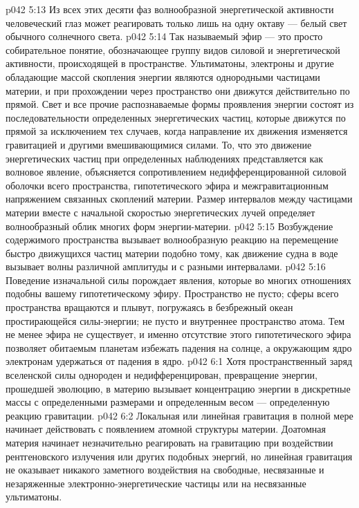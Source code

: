 \vs p042 5:13 \pc Из всех этих десяти фаз волнообразной энергетической активности человеческий глаз может реагировать только лишь на одну октаву --- белый свет обычного солнечного света.
\vs p042 5:14 \pc Так называемый эфир --- это просто собирательное понятие, обозначающее группу видов силовой и энергетической активности, происходящей в пространстве. Ультиматоны, электроны и другие обладающие массой скопления энергии являются однородными частицами материи, и при прохождении через пространство они движутся действительно по прямой. Свет и все прочие распознаваемые формы проявления энергии состоят из последовательности определенных энергетических частиц, которые движутся по прямой за исключением тех случаев, когда направление их движения изменяется гравитацией и другими вмешивающимися силами. То, что это движение энергетических частиц при определенных наблюдениях представляется как волновое явление, объясняется сопротивлением недифференцированной силовой оболочки всего пространства, гипотетического эфира и межгравитационным напряжением связанных скоплений материи. Размер интервалов между частицами материи вместе с начальной скоростью энергетических лучей определяет волнообразный облик многих форм энергии\hyp{}материи.
\vs p042 5:15 Возбуждение содержимого пространства вызывает волнообразную реакцию на перемещение быстро движущихся частиц материи подобно тому, как движение судна в воде вызывает волны различной амплитуды и с разными интервалами.
\vs p042 5:16 Поведение изначальной силы порождает явления, которые во многих отношениях подобны вашему гипотетическому эфиру. Пространство не пусто; сферы всего пространства вращаются и плывут, погружаясь в безбрежный океан простирающейся силы\hyp{}энергии; не пусто и внутреннее пространство атома. Тем не менее эфира не существует, и именно отсутствие этого гипотетического эфира позволяет обитаемым планетам избежать падения на солнце, а окружающим ядро электронам удержаться от падения в ядро.
\vs p042 6:1 Хотя пространственный заряд вселенской силы однороден и недифференцирован, превращение энергии, прошедшей эволюцию, в материю вызывает концентрацию энергии в дискретные массы с определенными размерами и определенным весом --- определенную реакцию гравитации.
\vs p042 6:2 Локальная или линейная гравитация в полной мере начинает действовать с появлением атомной структуры материи. Доатомная материя начинает незначительно реагировать на гравитацию при воздействии рентгеновского излучения или других подобных энергий, но линейная гравитация не оказывает никакого заметного воздействия на свободные, несвязанные и незаряженные электронно\hyp{}энергетические частицы или на несвязанные ультиматоны.
